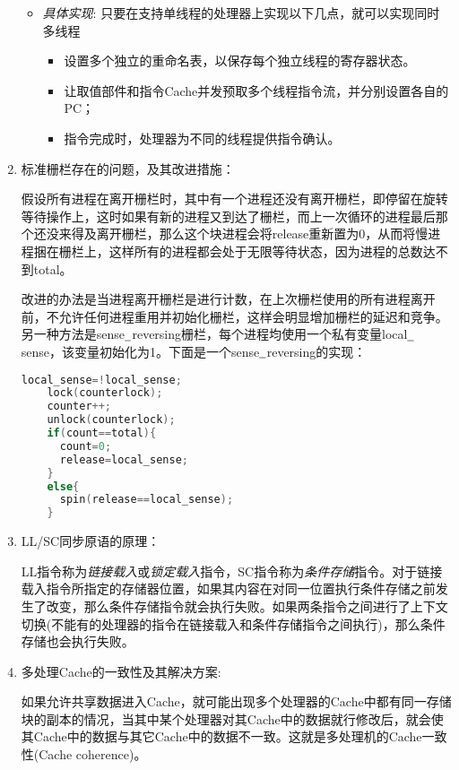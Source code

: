 \documentclass[a4paper]{ctexbook}
\newcommand{\li}{\uline{\hspace{0.5em}}}
\begin{document}
\begin{enumerate}
\begin{itemize}
    \item \emph{具体实现}:
    只要在支持单线程的处理器上实现以下几点，就可以实现同时多线程
    \begin{itemize}
      \item 设置多个独立的重命名表，以保存每个独立线程的寄存器状态。
      \item 让取值部件和指令Cache并发预取多个线程指令流，并分别设置各自的PC；
      \item 指令完成时，处理器为不同的线程提供指令确认。
    \end{itemize}
  \end{itemize}

  \item 标准栅栏存在的问题，及其改进措施：
  
  假设所有进程在离开栅栏时，其中有一个进程还没有离开栅栏，即停留在旋转等待操作上，这时如果有新的进程又到达了栅栏，而上一次循环的进程最后那个还没来得及离开栅栏，那么这个块进程会将release重新置为0，从而将慢进程捆在栅栏上，这样所有的进程都会处于无限等待状态，因为进程的总数达不到total。
  
  改进的办法是当进程离开栅栏是进行计数，在上次栅栏使用的所有进程离开前，不允许任何进程重用并初始化栅栏，这样会明显增加栅栏的延迟和竞争。
  另一种方法是sense$\li$reversing栅栏，每个进程均使用一个私有变量local$\li$sense，该变量初始化为1。下面是一个sense$\li$reversing的实现：
  \begin {lstlisting}[language=c]
    local_sense=!local_sense;
    lock(counterlock);
    counter++;
    unlock(counterlock);
    if(count==total){
      count=0;
      release=local_sense;
    }
    else{
      spin(release==local_sense);
    }
  \end{lstlisting}
  

  \item {\color{grey}LL/SC同步原语的原理：
  
  LL指令称为\emph{链接载入}或\emph{锁定载入}指令，SC指令称为\emph{条件存储}指令。对于链接载入指令所指定的存储器位置，如果其内容在对同一位置执行条件存储之前发生了改变，那么条件存储指令就会执行失败。如果两条指令之间进行了上下文切换(不能有的处理器的指令在链接载入和条件存储指令之间执行)，那么条件存储也会执行失败。}

  \item {\color{grey}多处理Cache的一致性及其解决方案:
  
  如果允许共享数据进入Cache，就可能出现多个处理器的Cache中都有同一存储块的副本的情况，当其中某个处理器对其Cache中的数据就行修改后，就会使其Cache中的数据与其它Cache中的数据不一致。这就是多处理机的Cache一致性(Cache coherence)。
  
}
\end{enumerate}
\end{document}
